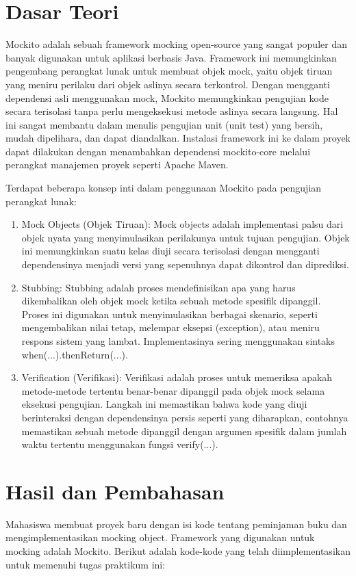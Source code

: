 \documentclass[a4paper,12pt]{article}
\begin{document}
\section{Dasar Teori}
Mockito adalah sebuah framework mocking open-source yang sangat populer dan banyak digunakan untuk aplikasi berbasis Java. Framework ini memungkinkan pengembang perangkat lunak untuk membuat objek mock, yaitu objek tiruan yang meniru perilaku dari objek aslinya secara terkontrol. Dengan mengganti dependensi asli menggunakan mock, Mockito memungkinkan pengujian kode secara terisolasi tanpa perlu mengeksekusi metode aslinya secara langsung. Hal ini sangat membantu dalam menulis pengujian unit (unit test) yang bersih, mudah dipelihara, dan dapat diandalkan. Instalasi framework ini ke dalam proyek dapat dilakukan dengan menambahkan dependensi mockito-core melalui perangkat manajemen proyek seperti Apache Maven.

Terdapat beberapa konsep inti dalam penggunaan Mockito pada pengujian perangkat lunak:
\begin{enumerate}
    \item Mock Objects (Objek Tiruan): Mock objects adalah implementasi palsu dari objek nyata yang menyimulasikan perilakunya untuk tujuan pengujian. Objek ini memungkinkan suatu kelas diuji secara terisolasi dengan mengganti dependensinya menjadi versi yang sepenuhnya dapat dikontrol dan diprediksi.
    \item Stubbing: Stubbing adalah proses mendefinisikan apa yang harus dikembalikan oleh objek mock ketika sebuah metode spesifik dipanggil. Proses ini digunakan untuk menyimulasikan berbagai skenario, seperti mengembalikan nilai tetap, melempar eksepsi (exception), atau meniru respons sistem yang lambat. Implementasinya sering menggunakan sintaks when(...).thenReturn(...).
    \item Verification (Verifikasi): Verifikasi adalah proses untuk memeriksa apakah metode-metode tertentu benar-benar dipanggil pada objek mock selama eksekusi pengujian. Langkah ini memastikan bahwa kode yang diuji berinteraksi dengan dependensinya persis seperti yang diharapkan, contohnya memastikan sebuah metode dipanggil dengan argumen spesifik dalam jumlah waktu tertentu menggunakan fungsi verify(...).
\end{enumerate}

\section{Hasil dan Pembahasan}
Mahasiswa membuat proyek baru dengan isi kode tentang peminjaman buku dan mengimplementasikan mocking object. Framework yang digunakan untuk mocking adalah Mockito. Berikut adalah kode-kode yang telah diimplementasikan untuk memenuhi tugas praktikum ini:
\end{document}
